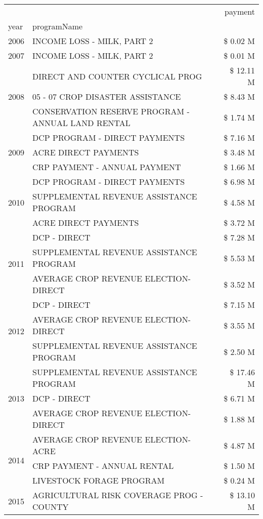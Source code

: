 \begin{tabular}{llr}
\toprule
 &  & payment \\
year & programName &  \\
\midrule
2006 & INCOME LOSS - MILK, PART 2 & \$ 0.02 M \\
\cline{1-3}
2007 & INCOME LOSS - MILK, PART 2 & \$ 0.01 M \\
\cline{1-3}
\multirow[t]{3}{*}{2008} & DIRECT AND COUNTER CYCLICAL PROG & \$ 12.11 M \\
 & 05 - 07 CROP DISASTER ASSISTANCE & \$ 8.43 M \\
 & CONSERVATION RESERVE PROGRAM - ANNUAL LAND RENTAL & \$ 1.74 M \\
\cline{1-3}
\multirow[t]{3}{*}{2009} & DCP PROGRAM - DIRECT PAYMENTS & \$ 7.16 M \\
 & ACRE DIRECT PAYMENTS & \$ 3.48 M \\
 & CRP PAYMENT - ANNUAL PAYMENT & \$ 1.66 M \\
\cline{1-3}
\multirow[t]{3}{*}{2010} & DCP PROGRAM - DIRECT PAYMENTS & \$ 6.98 M \\
 & SUPPLEMENTAL REVENUE ASSISTANCE PROGRAM & \$ 4.58 M \\
 & ACRE DIRECT PAYMENTS & \$ 3.72 M \\
\cline{1-3}
\multirow[t]{3}{*}{2011} & DCP - DIRECT & \$ 7.28 M \\
 & SUPPLEMENTAL REVENUE ASSISTANCE PROGRAM & \$ 5.53 M \\
 & AVERAGE CROP REVENUE ELECTION-DIRECT & \$ 3.52 M \\
\cline{1-3}
\multirow[t]{3}{*}{2012} & DCP - DIRECT & \$ 7.15 M \\
 & AVERAGE CROP REVENUE ELECTION-DIRECT & \$ 3.55 M \\
 & SUPPLEMENTAL REVENUE ASSISTANCE PROGRAM & \$ 2.50 M \\
\cline{1-3}
\multirow[t]{3}{*}{2013} & SUPPLEMENTAL REVENUE ASSISTANCE PROGRAM & \$ 17.46 M \\
 & DCP - DIRECT & \$ 6.71 M \\
 & AVERAGE CROP REVENUE ELECTION-DIRECT & \$ 1.88 M \\
\cline{1-3}
\multirow[t]{3}{*}{2014} & AVERAGE CROP REVENUE ELECTION-ACRE & \$ 4.87 M \\
 & CRP PAYMENT - ANNUAL RENTAL & \$ 1.50 M \\
 & LIVESTOCK FORAGE PROGRAM & \$ 0.24 M \\
\cline{1-3}
\multirow[t]{3}{*}{2015} & AGRICULTURAL RISK COVERAGE PROG - COUNTY & \$ 13.10 M \\

\end{tabular}
